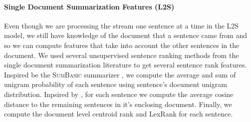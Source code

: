 \paragraph{Single Document Summarization Features (L2S)}
Even though we are processing the stream one sentence at a time in the L2S
model, we still
have knowledge of the document that a sentence came from and so we can
compute features that take into account the other sentences in the document.
We used several unsupervised sentence ranking methods from the single 
document summarization literature to get several sentence rank features.
Inspired be the \textsc{SumBasic} summarizer \citep{nenkova2005impact}, we
compute the average and sum of unigram probability of each sentence using 
sentence's document unigram distribution. Inpsired by \cite{guo2013updating},
for each sentence we compute the average cosine distance to the remaining 
sentences in it's enclosing document. Finally, we compute the document
level centroid rank \citep{radev2000centroid} and LexRank 
\citep{erkan2004lexrank} for each sentence.


